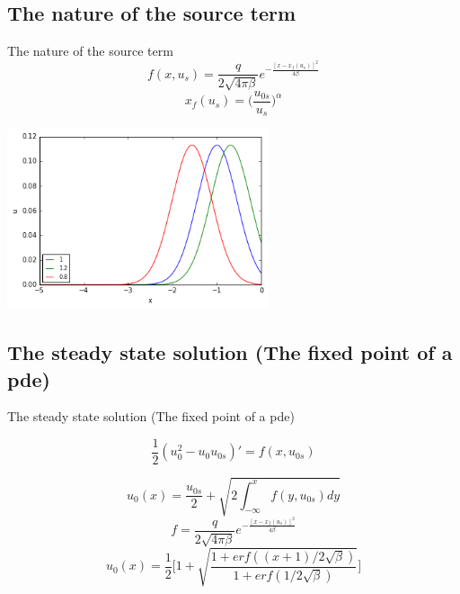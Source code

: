 \documentclass{beamer}
\begin{document}
	
\subsection{The nature of the source term}
\begin{frame}{The nature of the source term}
	\[f(x,u_{s})= \frac{q}{2\sqrt{4\pi \beta}} e^{-\frac{[x-x_f(u_s)]^2}{4\beta}}\]
	\[x_f(u_s) = \bigg(\frac{u_{0s}}{u_{s}}\bigg)^\alpha\]

  \begin{center}
  	\includegraphics[height=150pt]{shiftinit}\\
  	
  \end{center}

\end{frame}	

\subsection{The steady state solution (The fixed point of a pde)}
\begin{frame}{The steady state solution (The fixed point of a pde)}
	
	
	\[\frac{1}{2}(u_0^2-u_0u_{0s})' =f(x,u_{0s}) \]
	
	\[u_0(x)=\frac{u_{0s}}{2}+ \sqrt{2\int_{-\infty}^{x}f(y,u_{0s})dy}\]
	\[f= \frac{q}{2\sqrt{4\pi \beta}} e^{-\frac{[x-x_f(u_s)]^2}{4\beta}}\]
	\[u_0(x)= \frac{1}{2}\bigg[1+ \sqrt{\frac{1+erf((x+1)/2\sqrt{\beta})}{1+erf(1/2\sqrt{\beta})}}\bigg]\]
	
\end{frame}
	
\end{document}
